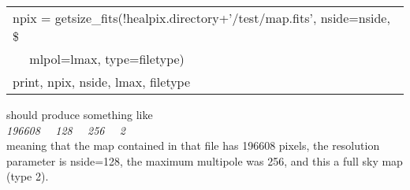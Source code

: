 \begin{example}
{
\begin{tabular}{l} %
 npix = getsize\_fits(!healpix.directory+'/test/map.fits', nside=nside, \$ \\
$\quad$       mlpol=lmax, type=filetype)\\
 print, npix, nside, lmax, filetype
\end{tabular}
}
{\parbox[t]{\hsize}{ should produce something like \\
   {\em 196608 \ \        128 \ \         256  \ \      2} \\
meaning that the map contained in that file has 196608 pixels, the resolution parameter is
nside=128, the maximum multipole was 256, and this a full sky map
(type 2).
}}
\end{example}

